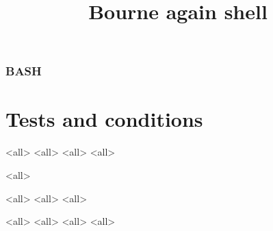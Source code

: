 
\title[bash]{Bourne again shell}




\begin{frame}
	\frametitle{BASH}
	\titlepage
	\vspace{-0.5cm}
	\begin{center}
	\end{center}
\end{frame}

\begin{frame}
	\tableofcontents
\end{frame}





\section{Tests and conditions}
\mode<all>{}
\mode<all>{}
\mode<all>{}
\mode<all>{}

\mode<all>{}


\mode<all>{}
\mode<all>{}
\mode<all>{}

\mode<all>{}
\mode<all>{}
\mode<all>{}
\mode<all>{}

